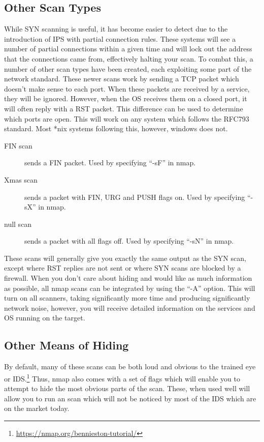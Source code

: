 		\subsection{Other Scan Types}
			While SYN scanning is useful, it has become easier to detect due to the introduction of IPS with partial connection rules. 
			These systems will see a number of partial connections within a given time and will lock out the address that the connections came from, effectively halting your scan. 
			To combat this, a number of other scan types have been created, each exploiting some part of the network standard. 
			These newer scans work by sending a TCP packet which doesn't make sense to each port. 
			When these packets are received by a service, they will be ignored. 
			However, when the OS receives them on a closed port, it will often reply with a RST packet. 
			This difference can be used to determine which ports are open. 
			This will work on any system which follows the RFC793 standard. 
			Most *nix systems following this, however, windows does not. 
			\begin{description}
				\item[FIN scan]
					sends a FIN packet. 
					Used by specifying ``-sF'' in nmap. 
				\item[Xmas scan]
					sends a packet with FIN, URG and PUSH flags on.
					Used by specifying ``-sX'' in nmap. 
				\item[null scan]
					sends a packet with all flags off. 
					Used by specifying ``-sN'' in nmap. 
			\end{description}
			These scans will generally give you exactly the same output as the SYN scan, except where RST replies are not sent or where SYN scans are blocked by a firewall. 
			When you don't care about hiding and would like as much information as possible, all nmap scans can be integrated by using the ``-A'' option. 
			This will turn on all scanners, taking significantly more time and producing significantly network noise, however, you will receive detailed information on the services and OS running on the target. 

		\subsection{Other Means of Hiding}
			By default, many of these scans can be both loud and obvious to the trained eye or IDS.\footnote{\url{https://nmap.org/bennieston-tutorial/}} 
			Thus, nmap also comes with a set of flags which will enable you to attempt to hide the most obvious parts of the scan. 
			These, when used well will allow you to run an scan which will not be noticed by most of the IDS which are on the market today. 


